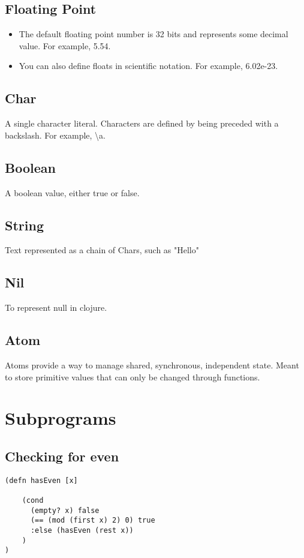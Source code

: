 \documentclass{article}
\begin{document}
\subsection{Floating Point}
\begin{itemize}
\item The default floating point number is 32 bits and represents some decimal value. For example, 5.54.
\item You can also define floats in scientific notation. For example, 6.02e-23.
\end{itemize}

\subsection{Char}
A single character literal. Characters are defined by being preceded with a backslash. For example, \textbackslash a.

\subsection{Boolean}
A boolean value, either true or false.

\subsection{String}
Text represented as a chain of Chars, such as "Hello"

\subsection{Nil}
To represent null in clojure.

\subsection{Atom}
Atoms provide a way to manage shared, synchronous, independent state. Meant to store primitive values that can only be changed through functions.


\section{Subprograms}
\subsection{Checking for even}
\begin{lstlisting}
(defn hasEven [x]

    (cond
      (empty? x) false
      (== (mod (first x) 2) 0) true
      :else (hasEven (rest x))
    )
)
\end{lstlisting}
\end{document}

